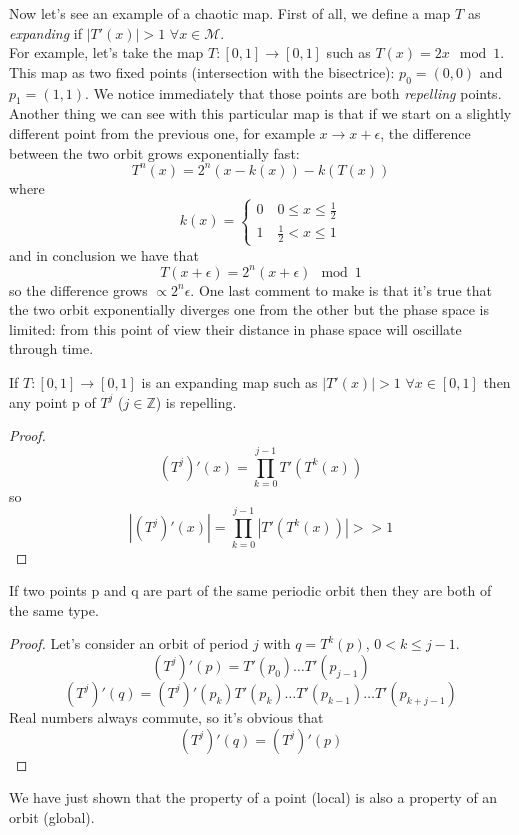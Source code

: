 Now let's see an example of a chaotic map.
First of all, we define a map $T$ as \emph{expanding} if $\left\lvert T'\left(x\right)\right\rvert > 1$ $\forall x \in \mathcal{M}$. \\
For example, let's take the map $T : \left[0,1\right] \to \left[0,1\right]$ such as $T\left(x\right)=2x \mod{1}$.
This map as two fixed points (intersection with the bisectrice): $p_0 = \left(0,0\right)$ and $p_1 = \left(1,1\right)$.
We notice immediately that those points are both \emph{repelling} points.
Another thing we can see with this particular map is that if we start on a slightly different point from the previous one, for example $x \to x + \epsilon$, the difference between the two orbit grows exponentially fast:
$$
    T^n\left(x\right)=2^n\left(x-k\left(x\right)\right)-k\left(T\left(x\right)\right)
$$
where
$$
    k\left(x\right)=
    \begin{cases}
        0 \quad 0\leq x \leq \frac{1}{2} \\
        1 \quad \frac{1}{2} < x \leq 1
    \end{cases}
$$
and in conclusion we have that
$$
    T\left(x + \epsilon\right)=2^n\left(x + \epsilon\right)\mod{1}
$$
so the difference grows $\propto 2^n\epsilon$.
One last comment to make is that it's true that the two orbit exponentially diverges one from the other but the phase space is limited: from this point of view their distance in phase space will oscillate through time.


\begin{prop}
    If $T : \left[0,1\right] \to \left[0,1\right]$ is an expanding map such as $\left\lvert T'\left(x\right)\right\rvert > 1$ $\forall x \in \left[0,1\right]$ then any point p of $T^j$ ($j \in \mathbb{Z}$) is repelling.
\end{prop}
\begin{proof}
    $$
        \left(T^j\right)'\left(x\right)=\prod_{k=0}^{j-1}T'\left(T^k\left(x\right)\right)
    $$
    so
    $$
        \left\lvert\left(T^j\right)'\left(x\right)\right\rvert = \prod_{k=0}^{j-1}\left\lvert T'\left(T^k\left(x\right)\right)\right\rvert >> 1
    $$
\end{proof}
\begin{prop}
    If two points p and q are part of the same periodic orbit then they are both of the same type.
\end{prop}
\begin{proof}
    Let's consider an orbit of period $j$ with $q=T^k\left(p\right)$, $0 < k \leq j-1$.
    $$
        \left(T^j\right)'\left(p\right) = T'\left(p_0\right)\ldots T'\left(p_{j-1}\right)
    $$
    $$
        \left(T^j\right)'\left(q\right) = \left(T^j\right)'\left(p_k\right) T'\left(p_k\right)\ldots T'\left(p_{k-1}\right) \ldots T'\left(p_{k+j-1}\right)
    $$
    Real numbers always commute, so it's obvious that
    $$
        \left(T^j\right)'\left(q\right) = \left(T^j\right)'\left(p\right)
    $$
\end{proof}
We have just shown that the property of a point (local) is also a property of an orbit (global).